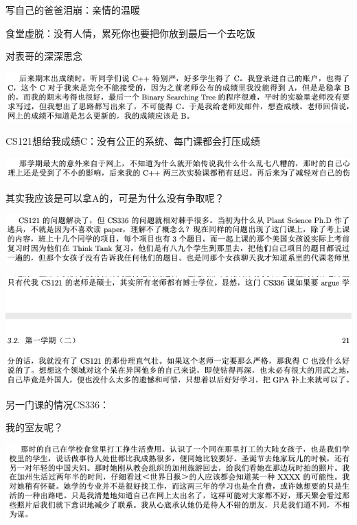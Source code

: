 \documentclass[9pt, b5paper]{article}
\begin{document}
写自己的爸爸泪崩：亲情的温暖

食堂虚脱：没有人情，累死你也要把你放到最后一个去吃饭

对表哥的深深思念

\begin{center}
\includegraphics[width=.9\linewidth]{./pic/backups_plans_20210424_205932.png}
\end{center}

CS121想给我成绩C：没有公正的系统、每门课都会打压成绩

\begin{center}
\includegraphics[width=.9\linewidth]{./pic/backups_plans_20210424_210025.png}
\end{center}

其实我应该是可以拿A的，可是为什么没有争取呢？

\begin{center}
\includegraphics[width=.9\linewidth]{./pic/backups_plans_20210424_210204.png}
\end{center}

\begin{center}
\includegraphics[width=.9\linewidth]{./pic/backups_plans_20210424_210328.png}
\end{center}

另一门课的情况CS336：

我的室友呢？

\begin{center}
\includegraphics[width=.9\linewidth]{./pic/backups_plans_20210424_210542.png}
\end{center}
\end{document}
